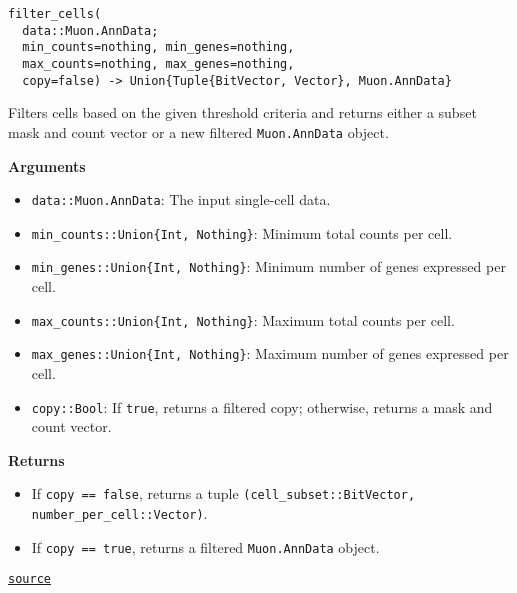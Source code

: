 \documentclass[oneside]{memoir}
\begin{document}
\begin{adjustwidth}{2em}{0pt}


\begin{verbatim}
filter_cells(
  data::Muon.AnnData;
  min_counts=nothing, min_genes=nothing,
  max_counts=nothing, max_genes=nothing,
  copy=false) -> Union{Tuple{BitVector, Vector}, Muon.AnnData}
\end{verbatim}

Filters cells based on the given threshold criteria and returns either a subset mask and count vector or a new filtered \texttt{Muon.AnnData} object.

\textbf{Arguments}

\begin{itemize}
\item \texttt{data::Muon.AnnData}: The input single-cell data.


\item \texttt{min\_counts::Union\{Int, Nothing\}}: Minimum total counts per cell.


\item \texttt{min\_genes::Union\{Int, Nothing\}}: Minimum number of genes expressed per cell.


\item \texttt{max\_counts::Union\{Int, Nothing\}}: Maximum total counts per cell.


\item \texttt{max\_genes::Union\{Int, Nothing\}}: Maximum number of genes expressed per cell.


\item \texttt{copy::Bool}: If \texttt{true}, returns a filtered copy; otherwise, returns a mask and count vector.

\end{itemize}
\textbf{Returns}

\begin{itemize}
\item If \texttt{copy == false}, returns a tuple \texttt{(cell\_subset::BitVector, number\_per\_cell::Vector)}.


\item If \texttt{copy == true}, returns a filtered \texttt{Muon.AnnData} object.

\end{itemize}


\href{https://github.com/zehua0417/Juscan.jl/blob/393ad1b827b678ea98a738f92af658ee9ed9a403/src/preprocessing/filter.jl#L13-L33}{\texttt{source}}




\end{adjustwidth}
\end{document}
